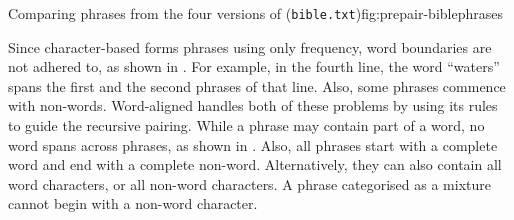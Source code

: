 {Comparing phrases from the four versions of \repair 
({\texttt {bible.txt}})}{fig:prepair-biblephrases}

Since character-based \repair forms phrases using only frequency,
word boundaries are not adhered to, as shown in 
.  For example, in the fourth
line, the word ``waters'' spans the first and the second phrases of
that line.  Also, some phrases commence with non-words.  Word-aligned
\repair handles both of these problems by using its rules
to guide the recursive pairing.  While a phrase may contain part of a
word, no word spans across phrases, as shown in 
.  Also, all phrases start 
with a complete word and end with a complete non-word.
Alternatively, they can also contain all word characters, or all 
non-word characters.  A phrase categorised as a mixture cannot begin 
with a non-word character.

